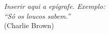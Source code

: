 
\clearpage{\thispagestyle{empty}\cleardoublepage}
\thispagestyle{empty}
\vspace*{20cm}

\begin{flushright}
{\it Inserir aqui a epígrafe. Exemplo: \\
``Só os loucos sabem.''}\\
(Charlie Brown)
\end{flushright}